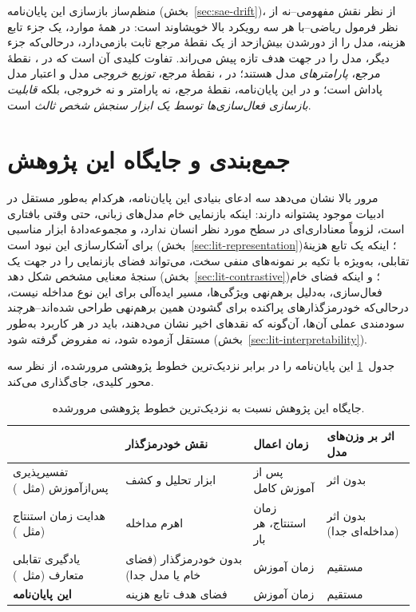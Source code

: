 منظم‌ساز بازسازی این پایان‌نامه (بخش~\ref{sec:sae-drift})، از نظر نقش مفهومی--نه از نظر فرمول ریاضی--با هر سه رویکرد بالا خویشاوند است: در همهٔ موارد، یک جزء تابع هزینه، مدل را از دورشدن بیش‌ازحد از یک نقطهٔ مرجع ثابت بازمی‌دارد، درحالی‌که جزء دیگر، مدل را در جهت هدف تازه پیش می‌راند. تفاوت کلیدی آن است که در
، نقطهٔ مرجع، \emph{پارامترهای} مدل هستند؛ در
، نقطهٔ مرجع، \emph{توزیع خروجی} مدل و اعتبار مدل پاداش است؛ و در این پایان‌نامه، نقطهٔ مرجع، نه پارامتر و نه خروجی، بلکه \emph{قابلیت بازسازی فعال‌سازی‌ها توسط یک ابزار سنجش شخص ثالث} است.%

\section{جمع‌بندی و جایگاه این پژوهش}
\label{sec:lit-summary}
مرور بالا نشان می‌دهد سه ادعای بنیادی این پایان‌نامه، هرکدام به‌طور مستقل در ادبیات موجود پشتوانه دارند: اینکه بازنمایی خام مدل‌های زبانی، حتی وقتی بافتاری است، لزوماً معناداری‌ای در سطح مورد نظر انسان ندارد، و مجموعه‌دادهٔ
ابزار مناسبی برای آشکارسازی این نبود است (بخش~\ref{sec:lit-representation})؛ اینکه یک تابع هزینهٔ تقابلی، به‌ویژه با تکیه بر نمونه‌های منفی سخت، می‌تواند فضای بازنمایی را در جهت یک سنجهٔ معنایی مشخص شکل دهد (بخش~\ref{sec:lit-contrastive})؛ و اینکه فضای خام فعال‌سازی، به‌دلیل برهم‌نهی ویژگی‌ها، مسیر ایده‌آلی برای این نوع مداخله نیست، درحالی‌که خودرمزگذارهای پراکنده برای گشودن همین برهم‌نهی طراحی شده‌اند--هرچند سودمندی عملی آن‌ها، آن‌گونه که نقدهای اخیر نشان می‌دهند، باید در هر کاربرد به‌طور مستقل آزموده شود، نه مفروض گرفته شود (بخش~\ref{sec:lit-interpretability}).

جدول~\ref{tab:lit-position} این پایان‌نامه را در برابر نزدیک‌ترین خطوط پژوهشی مرورشده، از نظر سه محور کلیدی، جای‌گذاری می‌کند.

\begin{table}[htb]
\centering
\caption{جایگاه این پژوهش نسبت به نزدیک‌ترین خطوط پژوهشی مرورشده.}
\label{tab:lit-position}
\begin{tabular}{p{3.5cm}p{3.3cm}p{3.3cm}p{3.2cm}}
\toprule
 & نقش خودرمزگذار & زمان اعمال & اثر بر وزن‌های مدل \\
\midrule
تفسیرپذیری پس‌ازآموزش (مثل~\cite{bricken2023monosemanticity}) & ابزار تحلیل و کشف & پس از آموزش کامل & بدون اثر \\
هدایت زمان استنتاج (مثل~\cite{templeton2024scaling,turner2023actadd}) & اهرم مداخله & زمان استنتاج، هر بار & بدون اثر \newline (مداخله‌ای جدا) \\
یادگیری تقابلی متعارف (مثل~\cite{gao2021simcse}) & بدون خودرمزگذار \newline (فضای خام یا مدل جدا) & زمان آموزش & مستقیم \\
\textbf{این پایان‌نامه} & فضای هدف تابع هزینه & زمان آموزش & مستقیم \\
\bottomrule
\end{tabular}
\end{table}

